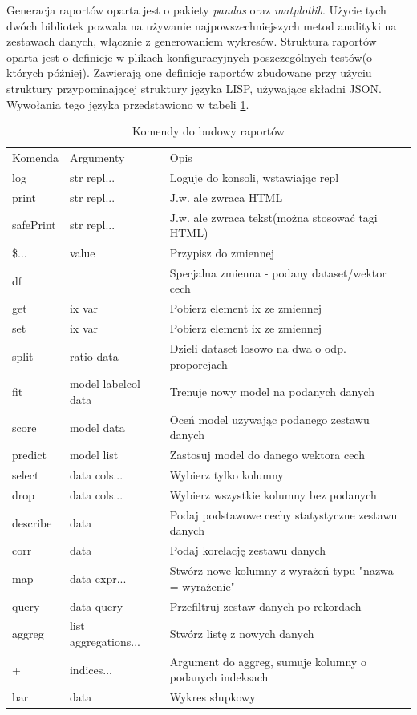 \documentclass[12pt,a4paper,oneside]{report} %
\begin{document}
Generacja raportów oparta jest o pakiety \emph{pandas} oraz \emph{matplotlib}. Użycie tych dwóch bibliotek pozwala na używanie najpowszechniejszych metod analityki na zestawach danych, włącznie z generowaniem wykresów. Struktura raportów oparta jest o definicje w plikach konfiguracyjnych poszczególnych testów(o których później). Zawierają one definicje raportów zbudowane przy użyciu struktury przypominającej struktury języka LISP, używające składni JSON. Wywołania tego języka przedstawiono w tabeli \ref{lang}.\par

\begin{table}
\begin{tabular}{l|l|l}
\hline
Komenda & Argumenty & Opis \\
log            & str  repl... & Loguje do konsoli, wstawiając repl \\
print          & str  repl... & J.w. ale zwraca HTML \\
safePrint      & str  repl... & J.w. ale zwraca tekst(można stosować tagi HTML)\\
\$...          & value & Przypisz do zmiennej\\
df             & & Specjalna zmienna - podany dataset/wektor cech\\
get            & ix var & Pobierz element ix ze zmiennej\\
set            & ix var & Pobierz element ix ze zmiennej \\
split          & ratio   data & Dzieli dataset losowo na dwa o odp. proporcjach \\
fit            & model   labelcol     data & Trenuje nowy model na podanych danych \\
score          & model   data & Oceń model uzywając podanego zestawu danych\\
predict        & model   list & Zastosuj model do danego wektora cech\\
select         & data cols... & Wybierz tylko kolumny\\
drop           & data cols... & Wybierz wszystkie kolumny bez podanych\\
describe       & data & Podaj podstawowe cechy statystyczne zestawu danych\\
corr           & data & Podaj korelację zestawu danych\\
map            & data expr... & Stwórz nowe kolumny z wyrażeń typu "nazwa = wyrażenie"\\
query          & data query & Przefiltruj zestaw danych po rekordach\\
aggreg         & list aggregations... & Stwórz listę z nowych danych\\
+              & indices... & Argument do aggreg, sumuje kolumny o podanych indeksach\\
bar            & data & Wykres słupkowy \\
\hline
\end{tabular}
\caption{Komendy do budowy raportów}
\label{lang}
\end{table}
\end{document}
